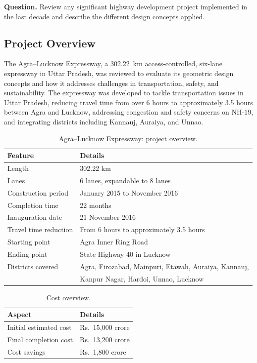 \documentclass[11pt]{article}
\begin{document}
\textbf{Question.} Review any significant highway development project implemented in the last decade
and describe the different design concepts applied.

\subsection{Project Overview}
The Agra--Lucknow Expressway, a 302.22~km access-controlled, six-lane expressway in Uttar Pradesh, was
reviewed to evaluate its geometric design concepts and how it addresses challenges in transportation,
safety, and sustainability. The expressway was developed to tackle transportation issues in Uttar
Pradesh, reducing travel time from over 6 hours to approximately 3.5 hours between Agra and Lucknow,
addressing congestion and safety concerns on NH-19, and integrating districts including Kannauj,
Auraiya, and Unnao.

\begin{table}[H]
  \centering
  \caption{Agra--Lucknow Expressway: project overview.}
  \begin{tabular}{@{}ll@{}}
    \toprule
    \textbf{Feature} & \textbf{Details} \\
    \midrule
    Length & 302.22 km \\
    Lanes & 6 lanes, expandable to 8 lanes \\
    Construction period & January 2015 to November 2016 \\
    Completion time & 22 months \\
    Inauguration date & 21 November 2016 \\
    Travel time reduction & From 6 hours to approximately 3.5 hours \\
    Starting point & Agra Inner Ring Road \\
    Ending point & State Highway 40 in Lucknow \\
    Districts covered & Agra, Firozabad, Mainpuri, Etawah, Auraiya, Kannauj, \\
                       & Kanpur Nagar, Hardoi, Unnao, Lucknow \\
    \bottomrule
  \end{tabular}
\end{table}

\begin{table}[H]
  \centering
  \caption{Cost overview.}
  \begin{tabular}{@{}ll@{}}
    \toprule
    \textbf{Aspect} & \textbf{Details} \\
    \midrule
    Initial estimated cost & Rs.~15{,}000 crore \\
    Final completion cost & Rs.~13{,}200 crore \\
    Cost savings & Rs.~1{,}800 crore \\
    \bottomrule
  \end{tabular}
\end{table}
\end{document}
